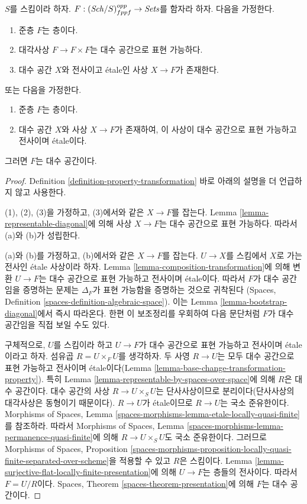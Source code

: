 \begin{theorem}
\label{theorem-bootstrap}
$S$를 스킴이라 하자.
$F : (\mathit{Sch}/S)_{fppf}^{opp} \to \textit{Sets}$를 함자라 하자.
다음을 가정한다.
\begin{enumerate}
\item 준층 $F$는 층이다.
\item 대각사상 $F  \to F \times F$는 대수 공간으로 표현 가능하다.
\item 대수 공간 $X$와 전사이고 \'etale인 사상 $X \to F$가 존재한다.
\end{enumerate}
또는 다음을 가정한다.
\begin{enumerate}
\item[(a)] 준층 $F$는 층이다.
\item[(b)] 대수 공간 $X$와 사상 $X \to F$가 존재하여, 이 사상이
대수 공간으로 표현 가능하고 전사이며 \'etale이다.
\end{enumerate}
그러면 $F$는 대수 공간이다.
\end{theorem}

\begin{proof}
Definition \ref{definition-property-transformation} 바로 아래의 설명을
더 언급하지 않고 사용한다.

\medskip\noindent
(1), (2), (3)을 가정하고, (3)에서와 같은 $X \to F$를 잡는다.
Lemma \ref{lemma-representable-diagonal}에 의해 사상 $X \to F$는 대수
공간으로 표현 가능하다. 따라서 (a)와 (b)가 성립한다.

\medskip\noindent
(a)와 (b)를 가정하고, (b)에서와 같은 $X \to F$를 잡는다. $U \to X$를
스킴에서 $X$로 가는 전사인 \'etale 사상이라 하자. Lemma
\ref{lemma-composition-transformation}에 의해 변환 $U \to F$는 대수
공간으로 표현 가능하고 전사이며 \'etale이다. 따라서 $F$가 대수 공간임을
증명하는 문제는 $\Delta_F$가 표현 가능함을 증명하는 것으로 귀착된다
(Spaces, Definition \ref{spaces-definition-algebraic-space}). 이는 Lemma
\ref{lemma-bootstrap-diagonal}에서 즉시 따라온다. 한편 이 보조정리를
우회하여 다음 문단처럼 $F$가 대수 공간임을 직접 보일 수도 있다.

\medskip\noindent
구체적으로, $U$를 스킴이라 하고 $U \to F$가 대수 공간으로 표현
가능하고 전사이며 \'etale이라고 하자. 섬유곱 $R = U \times_F U$를
생각하자. 두 사영 $R \to U$는 모두 대수 공간으로 표현 가능하고
전사이며 \'etale이다(Lemma \ref{lemma-base-change-transformation-property}).
특히 Lemma \ref{lemma-representable-by-spaces-over-space}에 의해 $R$은
대수 공간이다. 대수 공간의 사상 $R \to U \times_S U$는 단사사상이므로
분리이다(단사사상의 대각사상은 동형이기 때문이다). $R \to U$가
\'etale이므로 $R \to U$는 국소 준유한이다. Morphisms of Spaces, Lemma
\ref{spaces-morphisms-lemma-etale-locally-quasi-finite}를 참조하라. 따라서
Morphisms of Spaces, Lemma
\ref{spaces-morphisms-lemma-permanence-quasi-finite}에 의해
$R \to U \times_S U$도 국소 준유한이다. 그러므로 Morphisms of Spaces,
Proposition
\ref{spaces-morphisms-proposition-locally-quasi-finite-separated-over-scheme}을
적용할 수 있고 $R$은 스킴이다. Lemma
\ref{lemma-surjective-flat-locally-finite-presentation}에 의해 $U \to F$는
층들의 전사이다. 따라서 $F = U/R$이다. Spaces, Theorem
\ref{spaces-theorem-presentation}에 의해 $F$는 대수 공간이다.
\end{proof}


